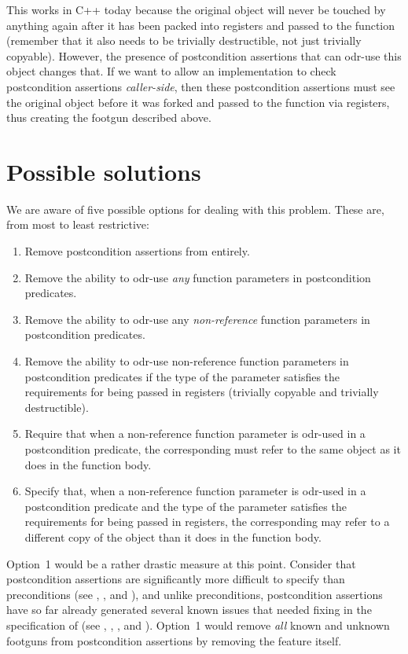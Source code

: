 This works in C++ today because the original object will never be touched by anything again after it has been packed into registers and passed to the function (remember that it also needs to be trivially destructible, not just trivially copyable). However, the presence of postcondition assertions that can odr-use this object changes that. If we want to allow an implementation to check postcondition assertions \emph{caller-side}, then these postcondition assertions must see the original object before it was forked and passed to the function via registers, thus creating the footgun described above.

\section{Possible solutions}

We are aware of five possible options for dealing with this problem. These are, from most to least
restrictive:

\begin{enumerate}
\item Remove postcondition assertions from \cite{P2900R10} entirely.
\item Remove the ability to odr-use \emph{any} function parameters in postcondition predicates.
\item Remove the ability to odr-use any \emph{non-reference} function parameters in postcondition predicates.
\item Remove the ability to odr-use non-reference function parameters in postcondition predicates if the type of the parameter satisfies the requirements for being passed in registers (trivially copyable and trivially destructible).
\item Require that when a non-reference function parameter is odr-used in a postcondition predicate, the corresponding  must refer to the same object as it does in the function body.
\item Specify that, when a non-reference function parameter is odr-used in a postcondition predicate and the type of the parameter satisfies the requirements for being passed in registers, the corresponding  may refer to a different copy of the object than it does in the function body.
\end{enumerate}

Option~1 would be a rather drastic measure at this point. Consider that postcondition assertions are significantly more difficult to specify than preconditions (see \cite{P1323R2}, \cite{P3007R0}, and \cite{P3098R0}), and unlike preconditions, postcondition assertions have so far already generated several known issues that needed fixing in the specification of \cite{P2900R10} (see \cite{P3387R0}, \cite{P3460R0}, \cite{D3483R0}, and \cite{D3484R0}). Option~1 would remove \emph{all} known and unknown footguns from postcondition assertions by removing the feature itself.


